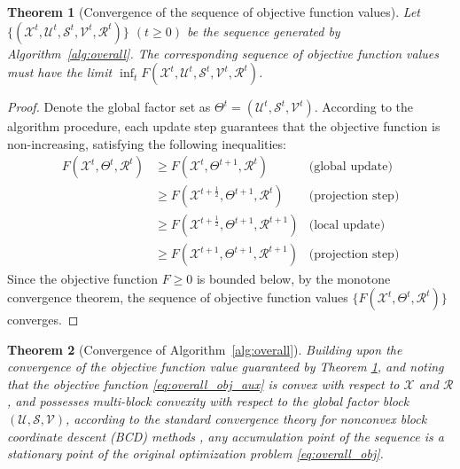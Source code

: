 \documentclass[a4paper,12pt]{article}
\numberwithin{equation}{section}
\numberwithin{algorithm}{section}
\newtheorem{theorem}{Theorem}[section]
\theoremstyle{remark}
\theoremstyle{definition}
\begin{document}
\begin{theorem}[Convergence of the sequence of objective function values]\label{con_th1}
	Let $\{(\mathcal{X}^{t},\mathcal{U}^{t},\mathcal{S}^{t},\mathcal{V}^{t},\mathcal{R}^{t})\}$ $(t\ge 0)$ be the sequence generated by Algorithm~\ref{alg:overall}. The corresponding sequence of objective function values must have the limit \( \inf_{t}F(\mathcal{X}^{t},\mathcal{U}^{t},\mathcal{S}^{t},\mathcal{V}^{t},\mathcal{R}^{t}) \). 
\end{theorem}

\begin{proof}
Denote the global factor set as $\Theta^t = (\mathcal{U}^t, \mathcal{S}^t, \mathcal{V}^t)$. According to the algorithm procedure, each update step guarantees that the objective function is non-increasing, satisfying the following inequalities:
\begin{equation}
	\begin{aligned}
		F(\mathcal{X}^t, \Theta^t, \mathcal{R}^t)
		&\ge F(\mathcal{X}^t, \Theta^{t+1}, \mathcal{R}^t) & \text{(global update)} \\
		&\ge F(\mathcal{X}^{t+\frac{1}{2}}, \Theta^{t+1}, \mathcal{R}^t) & \text{(projection step)} \\
		&\ge F(\mathcal{X}^{t+\frac{1}{2}}, \Theta^{t+1}, \mathcal{R}^{t+1}) & \text{(local update)} \\
		&\ge F(\mathcal{X}^{t+1}, \Theta^{t+1}, \mathcal{R}^{t+1}) & \text{(projection step)}
	\end{aligned}
\end{equation}
Since the objective function $F \ge 0$ is bounded below, by the monotone convergence theorem, the sequence of objective function values $\{F(\mathcal{X}^t, \Theta^t, \mathcal{R}^t)\}$ converges.	
\end{proof}




\begin{theorem}[Convergence of Algorithm~\ref{alg:overall}]
	Building upon the convergence of the objective function value guaranteed by Theorem \ref{con_th1}, and noting that the objective function \eqref{eq:overall_obj_aux} is convex with respect to $\mathcal{X}$ and $\mathcal{R}$, and possesses multi-block convexity with respect to the global factor block $(\mathcal{U}, \mathcal{S}, \mathcal{V})$, according to the standard convergence theory for nonconvex block coordinate descent (BCD) methods \cite{bertsekas1999nonlinear}, any accumulation point of the sequence is a stationary point of the original optimization problem \eqref{eq:overall_obj}.
\end{theorem}
\end{document}
